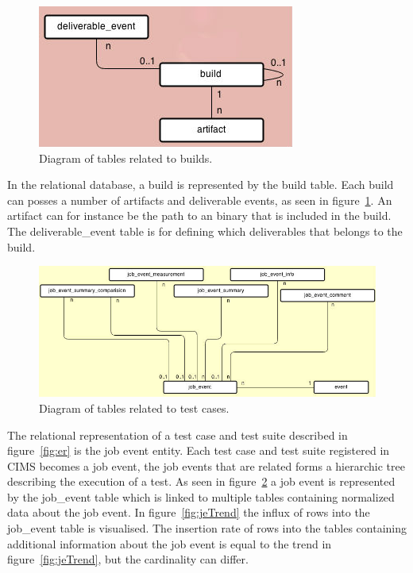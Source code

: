 \begin{figure}[h!]
\centering
\includegraphics[scale=0.5]{figure/build.jpg}
\caption{Diagram of tables related to builds.}
\label{fig:build}
\end{figure}
In the relational database, a build is represented by the build table. Each build can posses a number of artifacts and deliverable events, as seen in figure~\ref{fig:build}. An artifact can for instance be the path to an binary that is included in the build. The deliverable\_event table is for defining which deliverables that belongs to the build.
\label{sec:jobEvent}
\begin{figure}[h!]
\centering
\includegraphics[scale=0.5]{figure/job_event.jpg}
\caption{Diagram of tables related to test cases.}
\label{fig:job_event}
\end{figure}
The relational representation of a test case and test suite described in figure~\ref{fig:er} is the job event entity. Each test case and test suite registered in CIMS becomes a job event, the job events that are related forms a hierarchic tree describing the execution of a test. As seen in figure~\ref{fig:job_event} a job event is represented by the job\_event table which is linked to multiple tables containing normalized data about the job event. In figure~\ref{fig:jeTrend} the influx of rows into the job\_event table is visualised. The insertion rate of rows into the tables containing additional information about the job event is equal to the trend in figure~\ref{fig:jeTrend}, but the cardinality can differ. 


